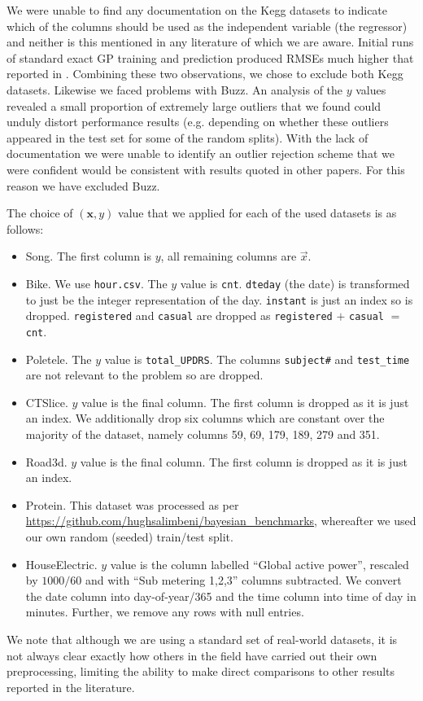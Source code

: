 \medskip
We were unable to find any documentation on the Kegg datasets to indicate which of the columns should be used as the independent variable (the regressor) and neither is this mentioned in any literature of which we are aware.
Initial runs of standard exact GP training and prediction produced RMSEs much higher that reported in \cite{Gard1}.
Combining these two observations, we chose to exclude both Kegg datasets. Likewise we faced problems with Buzz. An analysis of the $y$ values revealed a small proportion of extremely large outliers that we found could unduly distort performance results (e.g. depending on whether these outliers appeared in the test set for some of the random splits). With the lack of documentation we were unable to identify an outlier rejection scheme that we were confident would be consistent with results quoted in other papers. For this reason we have excluded Buzz. 

\medskip

The choice of $(\bm{x},y)$ value  that we applied for each of the used datasets is as follows: 
\begin{itemize}
    \item Song. The first column is $y$, all remaining columns are $\vec{x}$.
    \item Bike. We use \texttt{hour.csv}. The $y$ value is \texttt{cnt}. \texttt{dteday} (the date) is transformed to just be the integer representation of the day. \texttt{instant} is just an index so is dropped. \texttt{registered} and \texttt{casual} are dropped as \texttt{registered} $+$ \texttt{casual} $=$ \texttt{cnt}.
    \item Poletele. The $y$ value is \texttt{total\_UPDRS}. The columns \texttt{subject\#} and \texttt{test\_time} are not relevant to the problem so are dropped.
    \item CTSlice. $y$ value is the final column. The first column is dropped as it is just an index. We additionally drop six columns which are constant over the majority of the dataset, namely columns 59, 69, 179, 189, 279 and 351.
    \item Road3d. $y$ value is the final column. The first column is dropped as it is just an index.
    \item Protein. This dataset was processed as per \url{https://github.com/hughsalimbeni/bayesian_benchmarks}, whereafter we used our own random (seeded) train/test split.
    \item HouseElectric. $y$ value is the column labelled ``Global active power'', rescaled by $1000/60$ and with ``Sub metering 1,2,3'' columns subtracted. We convert the date column into day-of-year/365 and the time column into time of day in minutes. Further, we remove any rows with null entries.
\end{itemize}

We note that although we are using a standard set of real-world datasets, it is not always clear exactly how others in the field have carried out their own preprocessing, limiting the ability to make direct comparisons to other results reported in the literature.


